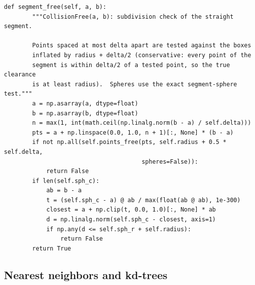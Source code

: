 \begin{lstlisting}[caption={The segment test of \code{World} (from \code{code/ch16\_rrt.py}): subdivision with the conservative margin $r+\delta/2$ for the boxes, the exact segment--sphere test for the spheres.},label={lst:ch16-segment}]
    def segment_free(self, a, b):
        """CollisionFree(a, b): subdivision check of the straight segment.

        Points spaced at most delta apart are tested against the boxes
        inflated by radius + delta/2 (conservative: every point of the
        segment is within delta/2 of a tested point, so the true clearance
        is at least radius).  Spheres use the exact segment-sphere test."""
        a = np.asarray(a, dtype=float)
        b = np.asarray(b, dtype=float)
        n = max(1, int(math.ceil(np.linalg.norm(b - a) / self.delta)))
        pts = a + np.linspace(0.0, 1.0, n + 1)[:, None] * (b - a)
        if not np.all(self.points_free(pts, self.radius + 0.5 * self.delta,
                                       spheres=False)):
            return False
        if len(self.sph_c):
            ab = b - a
            t = (self.sph_c - a) @ ab / max(float(ab @ ab), 1e-300)
            closest = a + np.clip(t, 0.0, 1.0)[:, None] * ab
            d = np.linalg.norm(self.sph_c - closest, axis=1)
            if np.any(d <= self.sph_r + self.radius):
                return False
        return True
\end{lstlisting}

\subsection{Nearest neighbors and kd-trees}
\label{sec:ch16-nearest}

